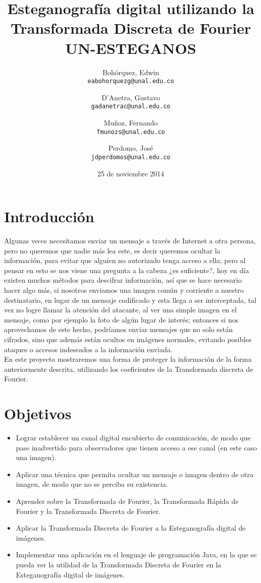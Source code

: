 \documentclass[a4paper]{article}
\title{Esteganografía digital utilizando la\\ Transformada Discreta de Fourier \\ \vspace{4 mm}  \large UN-ESTEGANOS  }
\author{
  Bohórquez, Edwin\\
  \texttt{eabohorquezg@unal.edu.co}
  \and
  D'Anetra, Gustavo\\
  \texttt{gadanetrac@unal.edu.co}
  \and
  Muñoz, Fernando\\
  \texttt{fmunozs@unal.edu.co}
  \and
  Perdomo, José\\
  \texttt{jdperdomos@unal.edu.co}
}
\date{25 de noviembre 2014}
\begin{document}
\maketitle


\section{Introducción}

Algunas veces necesitamos enviar un mensaje a través de Internet a otra persona, pero no queremos que nadie más lea este, es decir queremos ocultar la información, para evitar que alguien no autorizado tenga acceso a ella; pero al pensar en esto se nos viene una pregunta a la cabeza ¿es suficiente?, hoy en día existen muchos métodos para descifrar información, así que se hace necesario hacer algo más, si nosotros enviamos una imagen común y corriente a nuestro destinatario, en lugar  de un mensaje codificado y esta llega a ser interceptada, tal vez no logre llamar la atención del atacante, al ver una simple imagen en el mensaje, como por ejemplo la foto de algún lugar de interés; entonces si nos aprovechamos de este hecho, podríamos enviar mensajes que no solo están cifrados, sino que además están ocultos en imágenes normales, evitando posibles ataques o accesos indeseados a la información enviada.\\

En este proyecto mostraremos una forma de proteger la información de la forma anteriormente descrita, utilizando los coeficientes de la Transformada discreta de Fourier.\\

\section{Objetivos}

\begin{itemize}
\item Lograr establecer un canal digital encubierto de comunicación, de modo que pase inadvertido para observadores que tienen acceso a ese canal (en este caso una imagen).
\item Aplicar una técnica que permita ocultar un mensaje o imagen dentro de otra imagen, de modo que no se perciba su existencia.
\item Aprender sobre la Transformada de Fourier, la Transformada Rápida de Fourier y la Transformada Discreta de Fourier.
\item Aplicar la Transformada Discreta de Fourier a la Esteganografía digital de imágenes.
\item Implementar una aplicación en el lenguaje de programación Java, en la que se pueda ver la utilidad de la Transformada Discreta de Fourier en la Esteganografía digital de imágenes.
\end{itemize}
\end{document}
